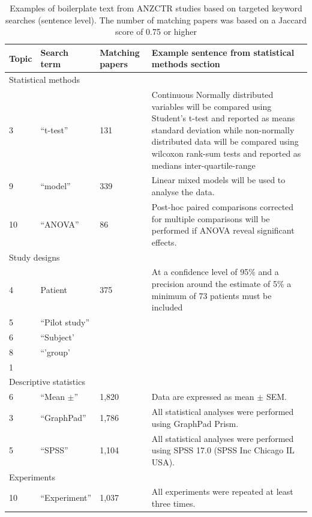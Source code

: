 \documentclass[12pt]{article}
\begin{document}
\begin{landscape}
\begin{table}

\caption{\label{tab:anzctr-example-boilerplate-sentence} Examples of boilerplate text from ANZCTR studies based on targeted keyword searches (sentence level). The number of matching papers was based on a Jaccard score of 0.75 or higher}
\centering
\begin{tabular}[t]{p{}p{}p{}p{}}
\hline
Topic & Search term &  Matching papers &  Example sentence from statistical methods section\\
\hline
\multicolumn{4}{l}{Statistical methods}\\
\hline
3 & ``t-test'' & 131 & Continuous Normally distributed variables will be compared using Student's t-test and reported as means standard deviation while non-normally distributed data will be compared using wilcoxon rank-sum tests and reported as medians inter-quartile-range\\
9 & ``model'' &  339 & Linear mixed models will be used to analyse the data.\\
10 & ``ANOVA'' & 86 & Post-hoc paired comparisons corrected for multiple comparisons will be performed if ANOVA reveal significant effects.\\
\hline
\multicolumn{4}{l}{Study designs}\\
4 & Patient & 375 & At a confidence level of 95\% and a precision around the estimate of 5\% a minimum of 73 patients must be included\\
5 & ``Pilot study'' & & \\
6 & ``Subject' & & \\
8 & ``'group'

\multicolumn{4}{l}{Qualitative analysis}\\
\hline
1 & & &\\
\hline
\multicolumn{4}{l}{Descriptive statistics}\\
\hline
6 & ``Mean $\pm$'' & 1,820 & Data are expressed as mean $\pm$ SEM.\\
\hline

3 & ``GraphPad'' &1,786  & All statistical analyses were performed using GraphPad Prism.\\
5 & ``SPSS'' & 1,104 & All statistical analyses were performed using SPSS 17.0 (SPSS Inc Chicago IL USA).\\
\hline

\multicolumn{4}{l}{Experiments}\\
\hline
10 & ``Experiment'' & 1,037 & All experiments were repeated at least three times.\\
\hline
\end{tabular}
\end{table}
\end{landscape}
\end{document}
